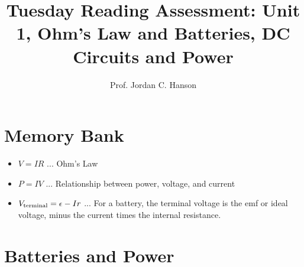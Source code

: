 \documentclass{article}
\begin{document}
\title{Tuesday Reading Assessment: Unit 1, Ohm's Law and Batteries, DC Circuits and Power}
\author{Prof. Jordan C. Hanson}

\maketitle

\section{Memory Bank}

\begin{itemize}
\item $V = IR$ ... Ohm's Law
\item $P = IV$ ... Relationship between power, voltage, and current
\item $V_{\rm terminal} = \epsilon - Ir$ ... For a battery, the terminal voltage is the emf or ideal voltage, minus the current times the internal resistance.
\end{itemize}

\section{Batteries and Power}
\end{document}
